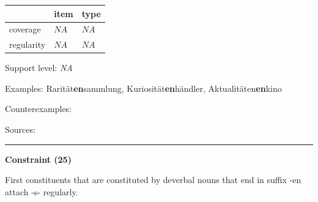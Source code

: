 \begin{table}[!ht]
\begin{center}
\setlength{\extrarowheight}{1pt}
\begin{tabularx}{\columnwidth}{|X|X|X|}
\hline
 & item & type \\
\hline
 coverage & $NA$ & $NA$ \\
\hline
 regularity & $NA$ & $NA$ \\
\hline
\end{tabularx}
\end{center}
\end{table}

\vspace{-1.35em}

\noindent
Support level: \textit{NA}

\vspace{0.3em}

\noindent
Examples: Rarität\textbf{en}sammlung, Kuriosität\textbf{en}händler, Aktualitäten\textbf{en}kino

\noindent
Counterexamples: 

\vspace{0.3em}

\noindent
Sources: \citet[94]{ortner_mueller-bollhagen_1991}

\vspace{0.35em}
\hrule




\vspace{0.4em}

\begin{center}
\textbf{Constraint (25)}
\end{center}

\noindent
First constituents that are constituted by deverbal nouns that end in suffix -en attach -s- regularly.
\vspace{0.5em}


\vspace{-0.25em}

